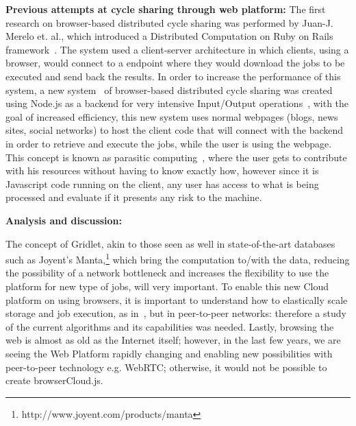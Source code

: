 \textbf{Previous attempts at cycle sharing through web platform: }
The first research on browser-based distributed cycle sharing was performed by Juan-J. Merelo et. al., which introduced a Distributed Computation on Ruby on Rails framework~\cite{Merelo2007}. The system used a client-server architecture in which clients, using a browser, would connect to a endpoint where they would download the jobs to be executed and send back the results. In order to increase the performance of this system, a new system~\cite{Duda2013} of browser-based distributed cycle sharing was created using Node.js as a backend for very intensive Input/Output operations~\cite{Tilkov2010}, with the goal of increased efficiency, this new system uses normal webpages (blogs, news sites, social networks) to host the client code that will connect with the backend in order to retrieve and execute the jobs, while the user is using the webpage. This concept is known as parasitic computing~\cite{Barabasi2001}, where the user gets to contribute with his resources without having to know exactly how, however since it is Javascript code running on the client, any user has access to what is being processed and evaluate if it presents any risk to the machine.

\textbf{Analysis and discussion: }

The concept of Gridlet, akin to those seen as well in state-of-the-art databases such as Joyent's Manta,\footnote{http://www.joyent.com/products/manta} which bring the computation to/with the data, reducing the possibility of a network bottleneck and increases the flexibility to use the platform for new type of jobs, will very important. To enable this new Cloud platform on using browsers, it is important to understand how to elastically scale storage and job execution, as in~\cite{Silva2011}, but in peer-to-peer networks: therefore a study of the current algorithms and its capabilities was needed. Lastly, browsing the web is almost as old as the Internet itself; however, in the last few years, we are seeing the Web Platform rapidly changing and enabling new possibilities with peer-to-peer technology e.g. WebRTC; otherwise, it would not be possible to create browserCloud.js. 
